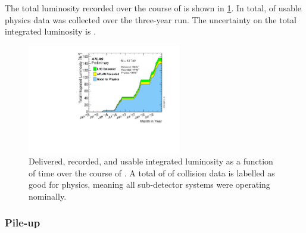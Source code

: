 The total luminosity recorded over the course of \runtwo is shown in \cref{fig:run2_lumi}. In total, \intlumi of usable physics data was collected over the three-year run.
The uncertainty on the total integrated luminosity is  \cite{ATLAS-CONF-2019-021}.
%
\begin{figure}[!htbp]
  \centering
  \includegraphics[width=0.6\textwidth]{chapters/2.detector/figs/intlumivstimeRun2DQall.pdf}
  \caption{
    Delivered, recorded, and usable integrated luminosity as a function of time over the course of \runtwo \cite{atlas-lumi-run2}.
    A total of \intlumi of collision data is labelled as good for physics, meaning all sub-detector systems were operating nominally.}
  \label{fig:run2_lumi}
\end{figure}
%


\subsubsection{Pile-up}

